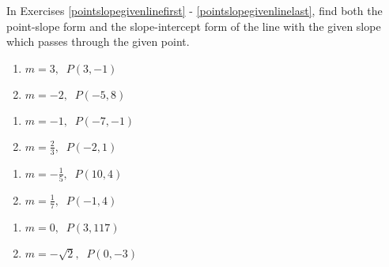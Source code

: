\documentclass{ximera}
\begin{document}
	\author{Stitz-Zeager}



\label{ExercisesforAppLines}

In Exercises \ref{pointslopegivenlinefirst} - \ref{pointslopegivenlinelast}, find both the point-slope form and the slope-intercept form of the line with the given slope which passes through the given point.

\begin{multicols}{2}
\begin{enumerate}

\item $m = 3, \;\; P(3, -1)$ \label{pointslopegivenlinefirst}
\item $m = -2, \;\; P(-5, 8)$

\setcounter{HW}{\value{enumi}}
\end{enumerate}
\end{multicols}

\begin{multicols}{2}
\begin{enumerate}
\setcounter{enumi}{\value{HW}}

\item $m = -1, \;\; P(-7, -1)$
\item $m = \frac{2}{3}, \;\; P(-2, 1)$

\setcounter{HW}{\value{enumi}}
\end{enumerate}
\end{multicols}

\begin{multicols}{2}
\begin{enumerate}
\setcounter{enumi}{\value{HW}}

\item $m = -\frac{1}{5}, \;\; P(10, 4)$
\item $m = \frac{1}{7}, \;\; P(-1, 4)$

\setcounter{HW}{\value{enumi}}
\end{enumerate}
\end{multicols}

\begin{multicols}{2}
\begin{enumerate}
\setcounter{enumi}{\value{HW}}

\item $m = 0, \;\; P(3, 117)$
\item $m = -\sqrt{2}, \;\; P(0, -3)$

\setcounter{HW}{\value{enumi}}
\end{enumerate}
\end{multicols}
\end{document}
